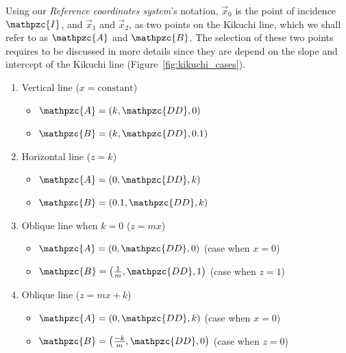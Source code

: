 \documentclass[letterpaper]{article}
\newcommand{\var}[1]{\mathpzc{#1}}
\begin{document}
	Using our \emph{Reference coordinates system}'s notation, $\vec{x}_0$ is the point of incidence $\var{I}$, and $\vec{x}_1$ and $\vec{x}_2$, as two points on the Kikuchi line, which we shall refer to as $\var{A}$ and $\var{B}$.  The selection of these two points requires to be discussed in more details since they are depend on the slope and intercept of the Kikuchi line (Figure~\ref{fig:kikuchi_cases}).
	\begin{enumerate}
		\item Vertical line ($x=\text{constant}$)
			\begin{itemize}
				\item $\var{A} = \left(k, \var{DD}, 0\right)$
				\item $\var{B} = \left(k, \var{DD}, 0.1\right)$
			\end{itemize}
		\item Horizontal line ($z=k$)
			\begin{itemize}
				\item $\var{A} = \left(0, \var{DD}, k\right)$
				\item $\var{B} = \left(0.1, \var{DD}, k\right)$
			\end{itemize}
		\item Oblique line when $k=0$ ($z=mx$)
			\begin{itemize}
				\item $\var{A} = \left(0, \var{DD}, 0\right)$ (case when $x=0$)
				\item $\var{B} = \left(\frac{1}{m}, \var{DD}, 1\right)$ (case when $z=1$)
			\end{itemize}
		\item Oblique line ($z=mx+k$)
			\begin{itemize}
				\item $\var{A} = \left(0, \var{DD}, k\right)$ (case when $x=0$)
				\item $\var{B} = \left(\frac{-k}{m}, \var{DD}, 0\right)$ (case when $z=0$)
			\end{itemize}
	\end{enumerate}
	
\end{document}
